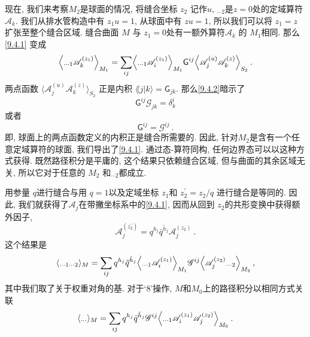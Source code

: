现在, 我们来考察$M_{2}$是球面的情况, 将缝合坐标 $z_{2}$ 记作$u$, ${}_{\cdots 2}$是$z=0$处的定域算符$\mathscr{A}_{k}$. 
我们从排水管构造中有 $z_{1} u=1$, 从球面中有 $z u=1$, 所以我们可以将 $z_{1}=z$ 扩张至整个缝合区域. 
缝合曲面 $M$ 与 $z_{1}=0$处有一额外算符$\mathscr{A}_{k}$ 的 $M_{1}$相同. 那么 \eqref{9.4.1} 变成
\begin{equation}
	\Bigl \langle {}_{\cdots 1} \mathscr{A}_{k}^{(z_{1})}\Bigr\rangle_{M_{1}} = 
	\sum_{i j}\Bigl\langle {}_{\cdots 1} \mathscr{A}_{i}^{(z_{1})}\Bigr\rangle_{M_{1}} \mathsf{G}^{ij} 
	\Bigl\langle\mathscr{A}_{j}^{(u)} \mathscr{A}_{k}^{(z)}\Bigr\rangle_{S_{2}} \:. \label{9.4.2}
\end{equation}
两点函数 $\langle\mathscr{A}_{j}^{(u)} \mathscr{A}_{k}^{(z)}\rangle_{S_{2}}$ 正是内积 $\lAngle j \vert k\rangle=\mathsf{G}_{jk}$. 
那么\eqref{9.4.2}暗示了
\begin{equation}
	\mathsf{G}^{ij} \mathscr{G}_{jk} = \delta_{k}^{i} \label{9.4.3}
\end{equation}
或者
\begin{equation}
	\mathsf{G}^{ij} = \mathscr{G}^{ij} \:. \label{9.4.4}
\end{equation}
即, 球面上的两点函数定义的内积正是缝合所需要的. 因此, 针对$M_{2}$是含有一个任意定域算符的球面, 我们导出了\eqref{9.4.1}. 
通过态-算符同构, 任何边界态可以以这种方式获得. 既然路径积分是平庸的, 这个结果只依赖缝合区域, 但与曲面的其余区域无关, 
所以它对于任意的 $M_{2}$ 和${}_{\cdots 2}$都成立.

用参量 $q$进行缝合与用 $q=1$以及定域坐标 $z_{1}$和 $z_{2}^{\prime}=z_{2} / q $ 进行缝合是等同的. 
因此, 我们就获得了$\mathscr{A}_{j}$在带撇坐标系中的\eqref{9.4.1}, 因而从回到 $z_{2}$的共形变换中获得额外因子,
\begin{equation}
	\mathscr{A}_{j}^{(z_{2}^{\prime})}=q^{h_{j}} \bar{q}^{\tilde{h}_{j}} \mathscr{A}_{j}^{(z_{2})} \:. \label{9.4.5}
\end{equation}
这个结果是
\begin{equation}
	\langle {}_{\cdots 1 \cdots 2} \rangle_{M} = \sum_{ij} q^{h_{j}} \tilde{q}^{\tilde{h}_{j}} 
	\Bigl\langle {}_{\cdots 1} \mathscr{A}_{i}^{(z_{1})}\Bigr\rangle_{M_{1}} \mathscr{G}^{i j} 
	\Bigl\langle\mathscr{A}_{j}^{(z_{2})} {}_{\cdots 2} \Bigr\rangle_{M_{2}} \:, \label{9.4.6}
\end{equation}
其中我们取了关于权重对角的基. 对于`8'操作,  $M$和$M_{0}$上的路径积分以相同方式关联
\begin{equation}
	\langle {}_{\cdots}\rangle_{M}=\sum_{i j} q^{h_{j}} \bar{q}^{\tilde{h}_{j}} \mathscr{G}^{ij} 
	\Bigl\langle {}_{\cdots 1} \mathscr{A}_{i}^{(z_{1})} \mathscr{A}_{j}^{(z_{2})}\Bigr\rangle_{M_{0}} \:. \label{9.4.7}
\end{equation}

